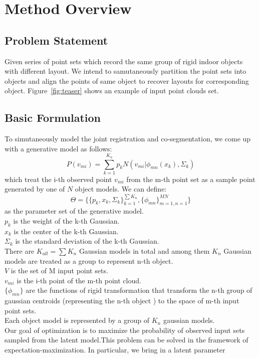 \section{Method Overview}
\label{sec:method}
\subsection{Problem Statement}
Given series of point sets which record the same group of rigid indoor objects with different layout. We intend to samutaneously partition the point sets into objects and align the points of same object to recover layouts for corresponding object. Figure~\ref{fig:teaser} shows an example of input point clouds set.
\subsection{Basic Formulation}
To simutaneously model the joint registration and co-segmentation,  we come up with a generative model as follows:
\begin{equation}
\label{equ:model}
P(v_{mi})=\sum^{K_n}_{k=1}p_kN(v_{mi}|\phi_{mn}(x_k),\Sigma_k)
\end{equation}
which treat the i-th observed point $v_{mi}$ from the m-th point set as a sample point generated by one of $N$ object models.
We can define:\\
$$\Theta=\{\{p_k,x_k,\Sigma_k\}_{k=1}^{\sum{K_n}},\{\phi_{mn}\}_{m=1,n=1}^{MN}\}$$
as the parameter set of the generative model.\\
$p_k$ is the weight of the k-th Gaussian.\\
$x_k$ is the center of the k-th Gaussian.\\
$\Sigma_k$ is the standard deviation of the k-th Gaussian.\\
There are $K_{all}=\sum{K_n}$ Gaussian models in total and among them $K_n$ Gaussian models are treated as a group to represent n-th object.\\
$V$ is the set of M input point sets.\\
$v_{mi}$ is the i-th point of the m-th point cloud.\\
$\{\phi_{mn}\}$ are the functions of rigid transformation that transform the n-th group of gaussian centroids (representing the n-th object ) to the space of m-th input point sets.\\ 
Each object model is represented by a group of $K_n$ gaussian models.\\
Our goal of optimization is to maximize the probability of observed input sets sampled from the latent model.This problem can be solved in the framework of expectation-maximization. In particular, we bring in a latent parameter\\
